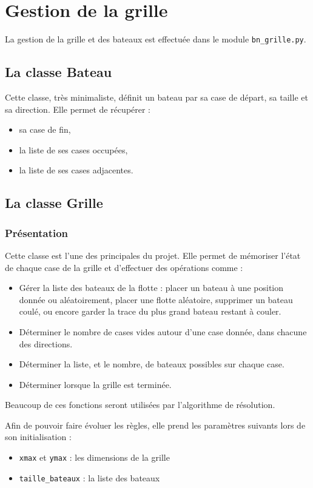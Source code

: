 \chapter{Gestion de la grille}\label{chap_grille}

La gestion de la grille et des bateaux est effectuée dans le module \texttt{bn\_grille.py}.

\section{La classe Bateau}
Cette classe, très minimaliste, définit un bateau par sa case de départ, sa taille et sa direction. Elle permet de récupérer :
\begin{itemize}
\item sa case de fin,
\item la liste de ses cases occupées,
\item la liste de ses cases adjacentes.
\end{itemize}

\section{La classe Grille}
\subsection{Présentation}
Cette classe est l'une des principales du projet. 
Elle permet de mémoriser l'état de chaque case de la grille et d'effectuer des opérations comme :
\begin{itemize}
\item Gérer la liste des bateaux de la flotte : placer un bateau à une position donnée ou aléatoirement, placer une flotte aléatoire, supprimer un bateau coulé, ou encore garder la trace du plus grand bateau restant à couler.
\item Déterminer le nombre de cases vides autour d'une case donnée, dans chacune des directions.
\item Déterminer la liste, et le nombre, de bateaux possibles sur chaque case.
\item Déterminer lorsque la grille est terminée.
\end{itemize}
Beaucoup de ces fonctions seront utilisées par l'algorithme de résolution.

Afin de pouvoir faire évoluer les règles, elle prend les paramètres suivants lors de son initialisation :
\begin{itemize}
\item \texttt{xmax} et \texttt{ymax} : les dimensions de la grille
\item \texttt{taille\_bateaux} : la liste des bateaux
\end{itemize}

